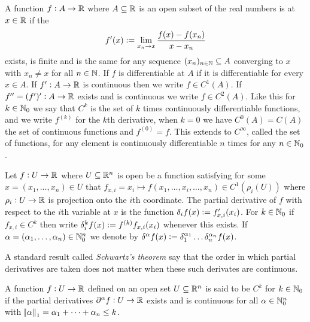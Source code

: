\begin{defn}
  A function $f : A \to \mathbb{R}$ where $A \subseteq \mathbb{R}$ is an open subset of the
  real numbers is 
  at $x \in \mathbb{R}$ if the 
  \[ f'(x) \vcentcolon= \lim_{x_n \to x} \frac{f(x) - f(x_n)}{x - x_n} \]
  exists, is finite and is the same for any sequence
  $(x_n)_{n \in \mathbb{N}} \subseteq A$
  converging to $x$
  with $x_n \neq x$ for all $n \in \mathbb{N}$.
  If $f$ is differentiable at $A$ if it is differentiable for every
  $x \in A$.
  If $f' : A \to \mathbb{R}$ is continuous then we write $f \in C^1(A)$.
  If $f'' = (f')' : A \to \mathbb{R}$ exists and is continuous we write
  $f \in C^2(A)$. Like this for $k \in \mathbb{N}_0$ we say that $C^k$
  is the set of $k$ times continuously
  differentiable functions, 
  and we write $f^{(k)}$ for the $k$th derivative,
  when $k=0$ we have $C^0(A) = C(A)$ the set of continuous functions and
  $f^{(0)} = f$.
  This extends to $C^\infty$, called the set of
   functions, for any element is continuously differentiable
  $n$ times for any $n \in \mathbb{N}_0$.
  \label{defn:diffR}
\end{defn}

\begin{defn}
  Let $f : U \to \mathbb{R}$ where $U \subseteq \mathbb{R}^n$ 
  is open be a function
  satisfying for some $x = (x_1, \dots, x_n) \in U$ that
  $f_{x, i} = x_i \mapsto f(x_1, \dots, x_i, \dots, x_n) \in C^1(\rho_i(U))$
  where $\rho_i : U \to \mathbb{R}$ is projection onto the $i$th coordinate.
  The partial derivative of $f$ with respect to the $i$th variable at $x$ is the
  function $\delta_i f(x) \vcentcolon= f_{x, i}'(x_i)$.
  For $k \in \mathbb{N}_0$
  if $f_{x, i} \in C^k$ then write
  $\delta_i^k f(x) \vcentcolon= f^{(k)} f_{x, i} (x_i)$ whenever this exists.
  If $\alpha = (\alpha_1, \dots, \alpha_n) \in \mathbb{N}_0^n$ we denote by
  $\delta^\alpha f(x) \vcentcolon= \delta_1^{\alpha_1} \dots \delta_n^{\alpha_n} f(x)$.
  \label{defn:partialDer}
\end{defn}
\begin{rem}
  A standard result called \emph{Schwartz's theorem} say that the order
  in which partial derivatives are taken does not matter when
  these such derivates are continuous.
\end{rem}

\begin{defn}[Differentiability in $\R^n$]
  A function $f: U \to \mathbb{R}$ defined on an open set $U \subseteq \mathbb{R}^n$
  is said to be $C^k$ for $k \in \mathbb{N}_0$ if
  the partial derivatives
  $\partial^\alpha f : U \to \mathbb{R}$ exists and is continuous for all
  $\alpha \in \mathbb{N}_0^n$ with $\norm{\alpha}_1 = \alpha_1 + \dots + \alpha_n \leq k$.
  \label{defn:diffRn}
\end{defn}

